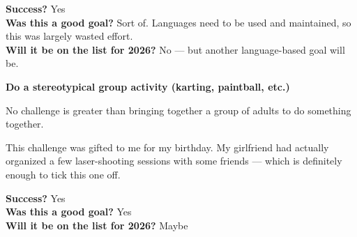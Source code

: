 \documentclass[12pt]{article}
\begin{document}
\textbf{Success?} Yes\\
\textbf{Was this a good goal?} Sort of. Languages need to be used and
maintained, so this was largely wasted effort.\\
\textbf{Will it be on the list for 2026?} No --- but another
language-based goal will be.

\textbf{Do a stereotypical group activity (karting, paintball, etc.)}

No challenge is greater than bringing together a group of adults to do
something together.

This challenge was gifted to me for my birthday. My girlfriend had
actually organized a few laser-shooting sessions with some friends ---
which is definitely enough to tick this one off.

\textbf{Success?} Yes\\
\textbf{Was this a good goal?} Yes\\
\textbf{Will it be on the list for 2026?} Maybe
\end{document}

